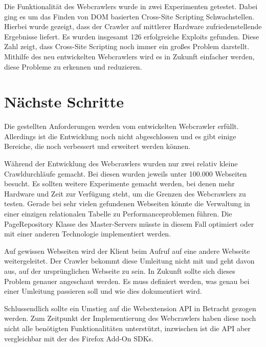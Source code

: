Die Funktionalität des Webcrawlers wurde in zwei Experimenten getestet. Dabei ging es um das Finden von DOM basierten Cross-Site Scripting Schwachstellen. Hierbei wurde gezeigt, dass der Crawler auf mittlerer Hardware zufriedenstellende Ergebnisse liefert. Es wurden insgesamt 126 erfolgreiche Exploits gefunden. Diese Zahl zeigt, dass Cross-Site Scripting noch immer ein großes Problem darstellt. Mithilfe des neu entwickelten Webcrawlers wird es in Zukunft einfacher werden, diese Probleme zu erkennen und reduzieren.

\section{Nächste Schritte}
Die gestellten Anforderungen werden vom entwickelten Webcrawler erfüllt. Allerdings ist die Entwicklung noch nicht abgeschlossen und es gibt einige Bereiche, die noch verbessert und erweitert werden können. 

Während der Entwicklung des Webcrawlers wurden nur zwei relativ kleine Crawldurchläufe gemacht. Bei diesen wurden jeweils unter 100.000 Webseiten besucht. Es sollten weitere Experimente gemacht werden, bei denen mehr Hardware und Zeit zur Verfügung steht, um die Grenzen des Webcrawlers zu testen. Gerade bei sehr vielen gefundenen Webseiten könnte die Verwaltung in einer einzigen relationalen Tabelle zu Performanceproblemen führen. Die PageRepository Klasse des Master-Servers müsste in diesem Fall optimiert oder mit einer anderen Technologie implementiert werden. 

Auf gewissen Webseiten wird der Klient beim Aufruf auf eine andere Webseite weitergeleitet. Der Crawler bekommt diese Umleitung nicht mit und geht davon aus, auf der ursprünglichen Webseite zu sein. In Zukunft sollte sich dieses Problem genauer angeschaut werden. Es muss definiert werden, was genau bei einer Umleitung passieren soll und wie dies dokumentiert wird.

Schlussendlich sollte ein Umstieg auf die Webextension API in Betracht gezogen werden. Zum Zeitpunkt der Implementierung des Webcrawlers haben diese noch nicht alle benötigten Funktionalitäten unterstützt, inzwischen ist die API aber vergleichbar mit der des Firefox Add-On SDKs.




